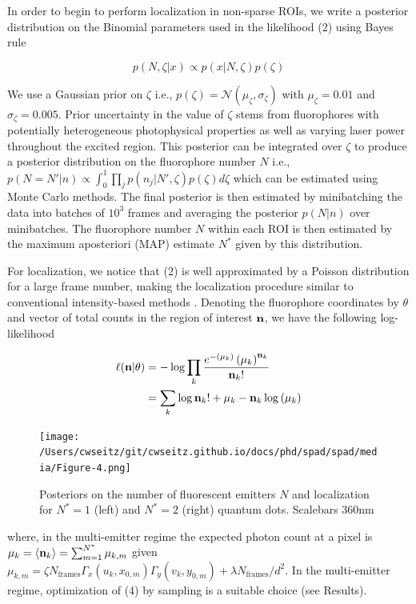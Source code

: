 In order to begin to perform localization in non-sparse ROIs, we write a posterior distribution on the Binomial parameters used in the likelihood (2) using Bayes rule

\begin{equation}
p(N,\zeta\lvert x) \propto p(x\lvert N,\zeta)p(\zeta)
\end{equation}

We use a Gaussian prior on $\zeta$ i.e., $p(\zeta) = \mathcal{N}(\mu_{\zeta},\sigma_{\zeta})$ with $\mu_{\zeta}=0.01$ and $\sigma_{\zeta}=0.005$. Prior uncertainty in the value of $\zeta$ stems from fluorophores with potentially heterogeneous photophysical properties as well as varying laser power throughout the excited region. This posterior can be integrated over $\zeta$ to produce a posterior distribution on the fluorophore number $N$ i.e., $p(N=N'\lvert n) \propto \int_{0}^{1} \prod_{j} p(n_{j}\lvert N',\zeta)p(\zeta) d\zeta$ which can be estimated using Monte Carlo methods. The final posterior is then estimated by minibatching the data into batches of $10^3$ frames and averaging the posterior $p(N\lvert n)$ over minibatches. The fluorophore number $N$ within each ROI is then estimated by the maximum aposteriori (MAP) estimate $N^{*}$ given by this distribution.

For localization, we notice that (2) is well approximated by a Poisson distribution for a large frame number, making the localization procedure similar to conventional intensity-based methods \parencite{Smith2010}. Denoting the fluorophore coordinates by $\theta$ and vector of total counts in the region of interest $\bold{n}$, we have the following log-likelihood


\begin{align}
\ell(\bold{n}\lvert \theta) &= -\log \prod_{k} \frac{e^{-\left(\mu_{k}\right)}\left(\mu_{k}\right)^{\bold{n}_k}}{\bold{n}_k!}\\
&= \sum_{k}  \log \bold{n}_k! + \mu_{k} - \bold{n}_k\log\left(\mu_{k}\right)
\end{align}

\begin{figure}[t]
\centering
\texttt{[image: /Users/cwseitz/git/cwseitz.github.io/docs/phd/spad/spad/media/Figure-4.png]}
\caption{Posteriors on the number of fluorescent emitters $N$ and localization for $N^{*}=1$ (left) and $N^{*}=2$ (right) quantum dots. Scalebars 360nm}
\end{figure}   

where, in the multi-emitter regime the expected photon count at a pixel is $\mu_{k} = \langle \bold{n}_k\rangle =\sum_{m=1}^{N^{*}} \mu_{k,m}$ given $\mu_{k,m}=\zeta N_{\mathrm{frames}}\Gamma_{x}(u_k,x_{0,m})\Gamma_{y}(v_k,y_{0,m}) + \lambda N_{\mathrm{frames}}/d^{2}$. In the multi-emitter regime, optimization of (4) by sampling is a suitable choice (see Results). 


